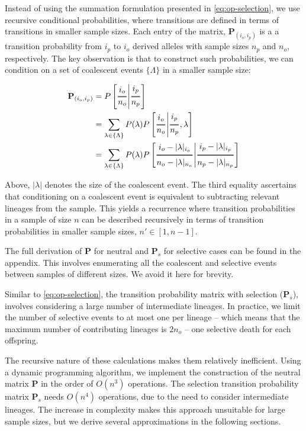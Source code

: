 \documentclass[review]{elsarticle}
\newcommand{\Dfrac}[2]{%
  \ooalign{%
    $\genfrac{}{}{1.2pt}0{#1}{#2}$\cr%
    $\color{white}\genfrac{}{}{.4pt}0{\phantom{#1}}{\phantom{#2}}$}%
}
\newcommand{\cond}{\middle\vert}
\begin{document}
Instead of using the summation formulation presented in \eqref{eq:op-selection}, we use recursive
conditional probabilities, where transitions are defined in terms of transitions in smaller
sample sizes. Each entry of the matrix, $\mathbf{P}_{(i_o,i_p)}$ is a a transition probability from
$i_p$ to $i_o$ derived alleles with sample sizes $n_p$ and $n_o$, respectively. The key observation
is that to construct such probabilities, we can condition on a set of coalescent events
$\{\Lambda\}$ in a smaller sample size:

\begin{align*}
  \mathbf{P}_{(i_o,i_p)} &= P\left[\Dfrac{i_o}{n_o} \cond \Dfrac{i_p}{n_p}\right] \\
  &= \sum_{\lambda\in\{\Lambda\}}P(\lambda)
  P\left[\Dfrac{i_o}{n_o} \cond \Dfrac{i_p}{n_p},\lambda\right] \\
  &= \sum_{\lambda\in\{\Lambda\}}P(\lambda)
  P\left[\Dfrac{i_o-|\lambda|_{i_o}}{n_o-|\lambda|_{n_o}} \cond \Dfrac{i_p-|\lambda|_{i_p}}{n_p-|\lambda|_{n_p}}\right]
\end{align*}

Above, $|\lambda|$ denotes the size of the coalescent event. The third equality ascertains that
conditioning on a coalescent event is equivalent to subtracting relevant lineages from the sample.
This yields a recurrence where transition probabilities in a sample of size $n$ can be
described recursively in terms of transition probabilities in smaller sample sizes, $n' \in [1, n-1]$.

The full derivation of $\mathbf{P}$ for neutral and $\mathbf{P}_s$ for selective cases can be found
in the appendix. This involves enumerating all the coalescent and selective events between samples of
different sizes. We avoid it here for brevity.

Similar to \eqref{eq:op-selection}, the transition probability matrix with selection
($\mathbf{P}_s$), involves considering a large number of intermediate lineages. In practice, we
limit the number of selective events to at most one per lineage -- which means that the maximum number of
contributing lineages is $2n_o$ -- one selective death for each offspring.

The recursive nature of these calculations makes them relatively inefficient. Using a dynamic
programming algorithm, we implement the construction of the neutral matrix $\mathbf{P}$ in the order
of $O(n^3)$ operations. The selection transition probability matrix $\mathbf{P}_s$ needs $O(n^4)$
operations, due to the need to consider intermediate lineages. The increase in complexity makes this
approach unsuitable for large sample sizes, but we derive several approximations in the following
sections.
\end{document}
